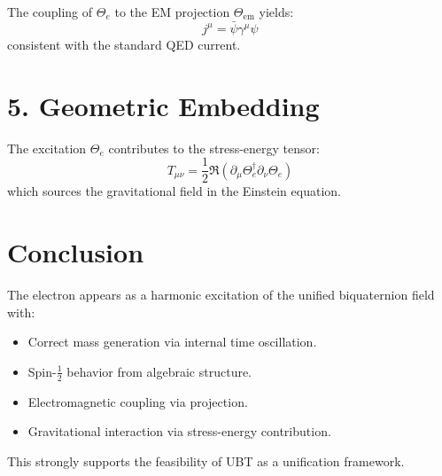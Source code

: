 \documentclass[12pt]{article}
\begin{document}
The coupling of $\Theta_e$ to the EM projection $\Theta_{\text{em}}$ yields:
\[
j^\mu = \bar{\psi} \gamma^\mu \psi
\]
consistent with the standard QED current.

\section*{5. Geometric Embedding}

The excitation $\Theta_e$ contributes to the stress-energy tensor:
\[
T_{\mu\nu} = \frac{1}{2} \Re \left( \partial_\mu \Theta_e^\dagger \partial_\nu \Theta_e \right)
\]
which sources the gravitational field in the Einstein equation.

\section*{Conclusion}

The electron appears as a harmonic excitation of the unified biquaternion field with:
\begin{itemize}
    \item Correct mass generation via internal time oscillation.
    \item Spin-$\frac{1}{2}$ behavior from algebraic structure.
    \item Electromagnetic coupling via projection.
    \item Gravitational interaction via stress-energy contribution.
\end{itemize}

This strongly supports the feasibility of UBT as a unification framework.
\end{document}
